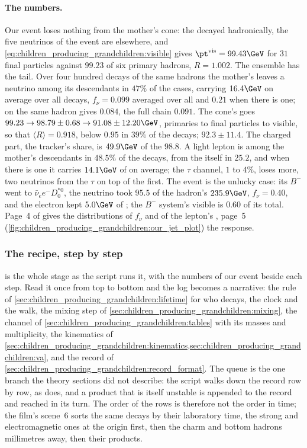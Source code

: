 \paragraph{The numbers.} Our event loses nothing from the mother's cone:
the \Bbar decayed hadronically, the five neutrinos of the event are
elsewhere, and \cref{eq:children_producing_grandchildren:visible} gives
$\pt^{\mathrm{vis}}=99.43\GeV$ for $31$ final particles against $99.23$
of six primary hadrons, $R=1.002$. The ensemble has the tail. Over four
hundred decays of the same hadrons the mother's \Bbar leaves a neutrino
among its descendants in $47\%$ of the cases, carrying $16.4\GeV$ on
average over all decays, $f_\nu=0.099$ averaged over all and $0.21$ when
there is one; \PYTHIA on the same hadron gives $0.084$, the full chain
$0.091$. The cone's \pt goes $99.23\to98.79\pm0.68\to91.08\pm12.20\GeV$,
primaries to final particles to visible, so that $\langle R\rangle=0.918$,
below $0.95$ in $39\%$ of the decays; \PYTHIA $92.3\pm11.4$. The charged
part, the tracker's share, is $49.9\GeV$ of the $98.8$. A light lepton is
among the mother's descendants in $48.5\%$ of the decays, from the \Bbar
itself in $25.2$, and when there is one it carries $14.1\GeV$ of \pt on
average; the $\tau$ channel, $1$ to $4\%$, loses more, two neutrinos from
the $\tau$ on top of the first. The \CMSSW event is the unlucky case:
its $B^-$ went to $\bar\nu_e e^-D_0^{*0}$, the neutrino took $95.5$ of the
hadron's $235.9\GeV$, $f_\nu=0.40$, and the electron kept $5.0\GeV$ of
\pt; the $B^-$ system's visible \pt is $0.60$ of its total. Page~4 of
 gives the distributions of $f_\nu$ and of
the lepton's \pt, page~5 (\cref{fig:children_producing_grandchildren:our_jet_plot})
the response.

\subsubsection{The recipe, step by step}
\label{sec:children_producing_grandchildren:step_by_step}

 is the whole stage as the
script runs it, with the numbers of our event beside each step. Read it
once from top to bottom and the  log becomes a narrative: the
rule of \cref{sec:children_producing_grandchildren:lifetime} for who
decays, the clock and the walk, the mixing step of
\cref{sec:children_producing_grandchildren:mixing}, the channel of
\cref{sec:children_producing_grandchildren:tables} with its masses and
multiplicity, the kinematics of
\cref{sec:children_producing_grandchildren:kinematics,sec:children_producing_grandchildren:va},
and the record of \cref{sec:children_producing_grandchildren:record_format}.
The queue is the one branch the theory sections did not describe: the
script walks down the record row by row, as \PYTHIA does, and a product
that is itself unstable is appended to the record and reached in its turn.
The order of the rows is therefore not the order in time; the film's
scene~6 sorts the same decays by their laboratory time, the strong and
electromagnetic ones at the origin first, then the charm and bottom
hadrons millimetres away, then their products.

